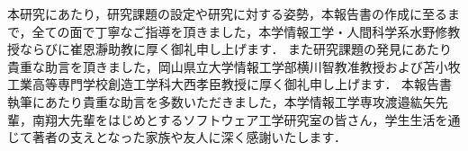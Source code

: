 \documentclass[main]{subfiles}
\begin{document}
\acknowledgement

本研究にあたり，研究課題の設定や研究に対する姿勢，本報告書の作成に至るまで，全ての面で丁寧なご指導を頂きました，本学情報工学・人間科学系水野修教授ならびに崔恩瀞助教に厚く御礼申し上げます．
また研究課題の発見にあたり貴重な助言を頂きました，岡山県立大学情報工学部横川智教准教授および苫小牧工業高等専門学校創造工学科大西孝臣教授に厚く御礼申し上げます．
本報告書執筆にあたり貴重な助言を多数いただきました，本学情報工学専攻渡邉紘矢先輩，南翔大先輩をはじめとするソフトウェア工学研究室の皆さん，学生生活を通じて著者の支えとなった家族や友人に深く感謝いたします．
\end{document}
